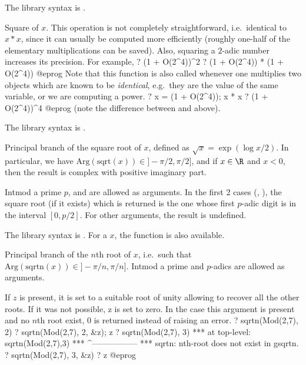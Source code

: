 The library syntax is .

\label{se:sqr}
Square of $x$. This operation is not completely
straightforward, i.e.~identical to $x * x$, since it can usually be
computed more efficiently (roughly one-half of the elementary
multiplications can be saved). Also, squaring a $2$-adic number increases
its precision. For example,
\bprog
? (1 + O(2^4))^2
? (1 + O(2^4)) * (1 + O(2^4))
@eprog\noindent
Note that this function is also called whenever one multiplies two objects
which are known to be \emph{identical}, e.g.~they are the value of the same
variable, or we are computing a power.
\bprog
? x = (1 + O(2^4)); x * x
? (1 + O(2^4))^4
@eprog\noindent
(note the difference between  and  above).

The library syntax is .

\label{se:sqrt}
Principal branch of the square root of $x$, defined as $\sqrt{x} =
\exp(\log x / 2)$. In particular, we have
$\text{Arg}(\text{sqrt}(x))\in{} ]-\pi/2, \pi/2]$, and if $x\in \R$ and $x<0$,
then the result is complex with positive imaginary part.

Intmod a prime $p$,  and  are allowed as arguments. In
the first 2 cases (, ), the square root (if it
exists) which is returned is the one whose first $p$-adic digit is in the
interval $[0,p/2]$. For other arguments, the result is undefined.

The library syntax is .
For a  $x$, the function
 is also available.

\label{se:sqrtn}
Principal branch of the $n$th root of $x$,
i.e.~such that $\text{Arg}(\text{sqrtn}(x))\in{} ]-\pi/n, \pi/n]$. Intmod
a prime and $p$-adics are allowed as arguments.

If $z$ is present, it is set to a suitable root of unity allowing to
recover all the other roots. If it was not possible, z is
set to zero. In the case this argument is present and no $n$th root exist,
$0$ is returned instead of raising an error.
\bprog
? sqrtn(Mod(2,7), 2)
? sqrtn(Mod(2,7), 2, &z); z
? sqrtn(Mod(2,7), 3)
  ***   at top-level: sqrtn(Mod(2,7),3)
  ***                 ^-----------------
  *** sqrtn: nth-root does not exist in gsqrtn.
? sqrtn(Mod(2,7), 3,  &z)
? z
@eprog

